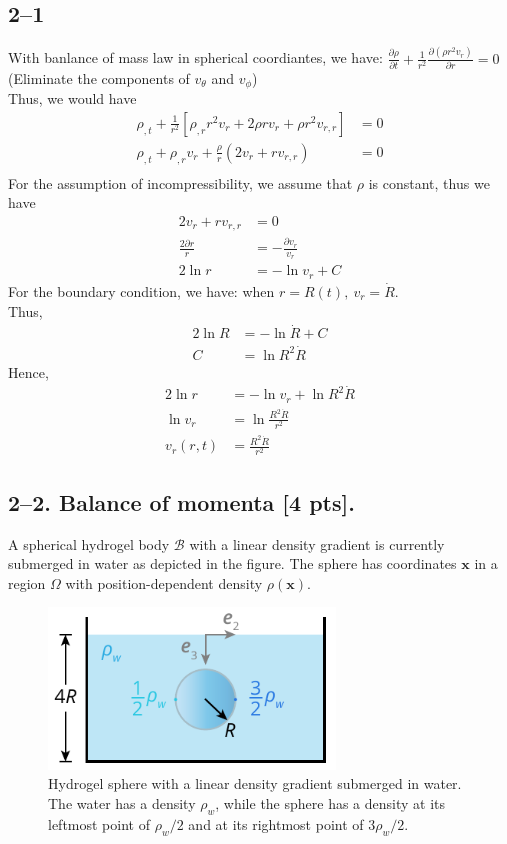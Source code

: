 \subsection*{2--1}
With banlance of mass law in spherical coordiantes, we have:
$\frac{\partial\rho}{\partial t}+\frac1{r^2} \frac{\partial(\rho r^2 v_r)}{\partial r} =0$ (Eliminate the components of $v_{\theta}$ and $v_{\phi}$) \\
Thus, we would have 
\begin{align*}
    \rho_{,t}+\frac1{r^2}[\rho_{,r}r^2 v_r+2\rho r v_r +\rho r^2 v_{r,r}]&=0 \\
    \rho_{,t}+ \rho_{,r} v_r + \frac{\rho}{r} (2v_r + r v_{r,r}) &= 0 \\
\end{align*}
For the assumption of incompressibility, we assume that $\rho$ is constant, thus we have 
\begin{align*}
    2v_r + rv_{r,r}&=0 \\
    \frac{2\partial r}{r} &= - \frac{\partial v_r}{v_r} \\
    2 \ln{r}&= -\ln{v_r} + C 
\end{align*}
For the boundary condition, we have: when $r=R(t),\ v_r = \dot{R}$.\\
Thus,
\begin{align*}
    2 \ln{R} &= -\ln{\dot{R}} +C\\
    C&= \ln{R^2 \dot{R}}
\end{align*}
Hence,
\begin{align*}
    2 \ln{r}&= -\ln{v_r} +\ln{R^2 \dot{R}} \\
    \ln{v_r} &= \ln{\frac{R^2 \dot{R}}{r^2}} \\
    v_r(r,t) &= \frac{R^2 \dot{R}}{r^2}
\end{align*}

\medskip
\subsection*{2--2. \textbf{Balance of momenta} [4 pts].} A spherical hydrogel body $\mathcal{B}$ with a linear density gradient is currently submerged in water as depicted in the figure. 
The sphere has coordinates $\bm{x}$ in a region $\Omega$ with position-dependent density $\rho(\bm{x})$. 

\begin{figure}[H]
\vspace{-2em}
\centering
\includegraphics[width=3in]{instr-figures/PS2-Q1.pdf}
\caption{\small{Hydrogel sphere with a linear density gradient submerged in water. The water has a density $\rho_w$, while the sphere has a density at its leftmost point of $\rho_w/2$ and at its rightmost point of $3\rho_w/2$.}}
\end{figure}

